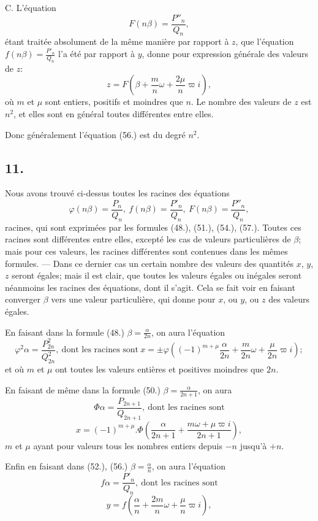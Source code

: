 \documentclass{article}
\begin{document}

C. L'équation
\[ F(n\beta)=\frac{P''_n}{Q_n}, \tag{56.} \]
étant traitée absolument de la même manière par rapport à $z$, que l'équation $f(n\beta)=\frac{P'_n}{Q_n}$ l'a été par rapport à $y$, donne pour expression générale des valeurs de $z$:
\[ z=F\left(\beta+\frac{m}{n}\omega+\frac{2\mu}{n}\varpi i\right), \tag{57.} \]
où $m$ et $\mu$ sont entiers, positifs et moindres que $n$. Le nombre des valeurs de $z$ est $n^{2}$, et elles sont en général toutes différentes entre elles.

Donc généralement l'équation (56.) est du degré $n^{2}$.

\subsection*{11.}

Nous avons trouvé ci-dessus toutes les racines des équations
\[ \varphi(n\beta)=\frac{P_n}{Q_n},\ f(n\beta)=\frac{P'_n}{Q_n},\ F(n\beta)=\frac{P''_n}{Q_n}, \]
racines, qui sont exprimées par les formules (48.), (51.), (54.), (57.). Toutes ces racines sont différentes entre elles, excepté les cas de valeurs particulières de $\beta$; mais pour ces valeurs, les racines différentes sont contenues dans les mêmes formules. --- Dans ce dernier cas un certain nombre des valeurs des quantités $x$, $y$, $z$ seront égales; mais il est clair, que toutes les valeurs égales ou inégales seront néanmoins les racines des équations, dont il s'agit. Cela se fait voir en faisant converger $\beta$ vers une valeur particulière, qui donne pour $x$, ou $y$, ou $z$ des valeurs égales.

En faisant dans la formule (48.) $\beta=\frac{\alpha}{2n}$, on aura l'équation
\[ \varphi^{2}\alpha=\frac{P_{2n}^{2}}{Q_{2n}^{2}},\ \text{dont les racines sont}\ x=\pm\varphi\left((-1)^{m+\mu}\frac{\alpha}{2n}+\frac{m}{2n}\omega+\frac{\mu}{2n}\varpi i\right); \tag{58.} \]
et où $m$ et $\mu$ ont toutes les valeurs entières et positives moindres que $2n$.

En faisant de même dans la formule (50.) $\beta=\frac{\alpha}{2n+1}$, on aura
\[ \Phi\alpha=\frac{P_{2n+1}}{Q_{2n+1}},\ \text{dont les racines sont} \]
\[ x=(-1)^{m+\mu}.\Phi\left(\frac{\alpha}{2n+1}+\frac{m\omega+\mu\varpi i}{2n+1}\right), \tag{59.} \]
$m$ et $\mu$ ayant pour valeurs tous les nombres entiers depuis $-n$ jusqu'à $+n$.

Enfin en faisant dans (52.), (56.) $\beta=\frac{\alpha}{n}$, on aura l'équation
\[ f\alpha=\frac{P'_n}{Q_n},\ \text{dont les racines sont} \]
\[ y=f\left(\frac{\alpha}{n}+\frac{2m}{n}\omega+\frac{\mu}{n}\varpi i\right), \tag{60.} \]
\end{document}

